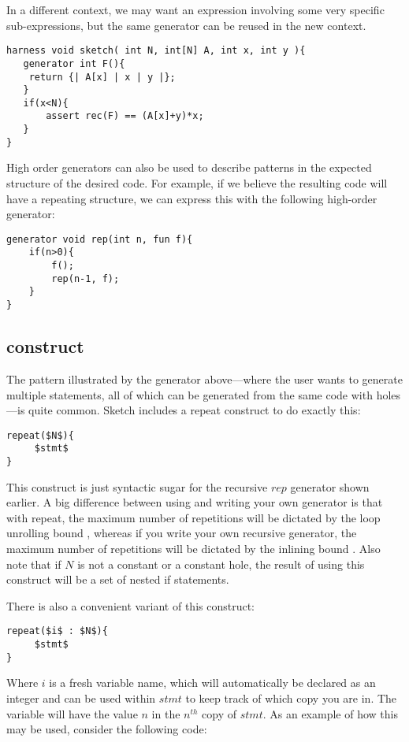 In a different context, we may want an expression involving some very specific sub-expressions, but the same generator can be reused in the new context.
\begin{lstlisting}
harness void sketch( int N, int[N] A, int x, int y ){   
   generator int F(){
	return {| A[x] | x | y |};
   }
   if(x<N){
	   assert rec(F) == (A[x]+y)*x;
   }
}
\end{lstlisting}

High order generators can also be used to describe patterns in the expected structure of the desired code. For example, if we believe the resulting code will have a repeating structure, we can express this with the following high-order generator: 

\begin{lstlisting}
generator void rep(int n, fun f){
    if(n>0){
        f();
        rep(n-1, f);
    }    
}
\end{lstlisting}



\subsection{ construct}
The pattern illustrated by the  generator above---where the user wants to generate multiple statements, all of which can be generated from the same code with holes---is quite common. Sketch includes a repeat construct to do exactly this: 
\begin{lstlisting}
repeat($N$){
     $stmt$
}
\end{lstlisting}
This construct is just syntactic sugar for the recursive $rep$ generator shown earlier. A big difference between using  and writing your own  generator is that with repeat, the maximum number of repetitions will be dictated by the loop unrolling bound , whereas if you write your own recursive generator, the maximum number of repetitions will be dictated by the inlining bound . Also note that if $N$ is not a constant or a constant hole, the result of using this construct will be a set of nested if statements.

There is also a convenient variant of this construct: 
\begin{lstlisting}
repeat($i$ : $N$){
     $stmt$
}
\end{lstlisting}
Where $i$ is a fresh variable name, which will automatically be declared as an integer and can be used within $stmt$ to keep track of which copy you are in. The variable will have the value $n$ in the $n^{th}$ copy of $stmt$. As an example of how this may be used, consider the following code:


